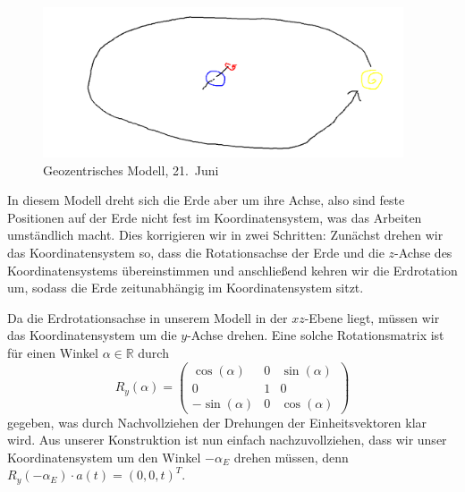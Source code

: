 \documentclass[
    paper=a4,
    DIV14,
    fontsize=12pt,
    pagesize=pdftex,
    toc=bibliographynumbered
]{scrartcl}
\numberwithin{figure}{section}
\numberwithin{equation}{section}
\numberwithin{table}{section}
\newcommand*\setR{\mathds{R}}
\begin{document}
\begin{figure}[htb]
    \centering
    \includegraphics[width=0.95\textwidth]{images/tmp/geoz.png}
    \caption{Geozentrisches Modell, 21.\ Juni}
    \label{fig:geoz}
\end{figure}

In diesem Modell dreht sich die Erde aber um ihre Achse, also sind feste Positionen auf
der Erde nicht fest im Koordinatensystem, was das Arbeiten umständlich macht. Dies
korrigieren wir in zwei Schritten: Zunächst drehen wir das Koordinatensystem so, dass
die Rotationsachse der Erde und die $z$-Achse des Koordinatensystems übereinstimmen und
anschließend kehren wir die Erdrotation um, sodass die Erde zeitunabhängig im
Koordinatensystem sitzt.

Da die Erdrotationsachse in unserem Modell in der $xz$-Ebene liegt, müssen wir das
Koordinatensystem um die $y$-Achse drehen. Eine solche Rotationsmatrix ist für einen
Winkel $\alpha\in\setR$ durch
\begin{equation*}
    R_y(\alpha) =
    \begin{pmatrix}
        \cos(\alpha)  & 0 & \sin(\alpha) \\
        0             & 1 & 0            \\
        -\sin(\alpha) & 0 & \cos(\alpha)
    \end{pmatrix}
\end{equation*}
gegeben, was durch Nachvollziehen der Drehungen der Einheitsvektoren klar wird. Aus
unserer Konstruktion ist nun einfach nachzuvollziehen, dass wir unser Koordinatensystem um
den Winkel $-\alpha_E$ drehen müssen, denn $R_y(-\alpha_E)\cdot a(t) = (0, 0, t)^T$.
\end{document}
